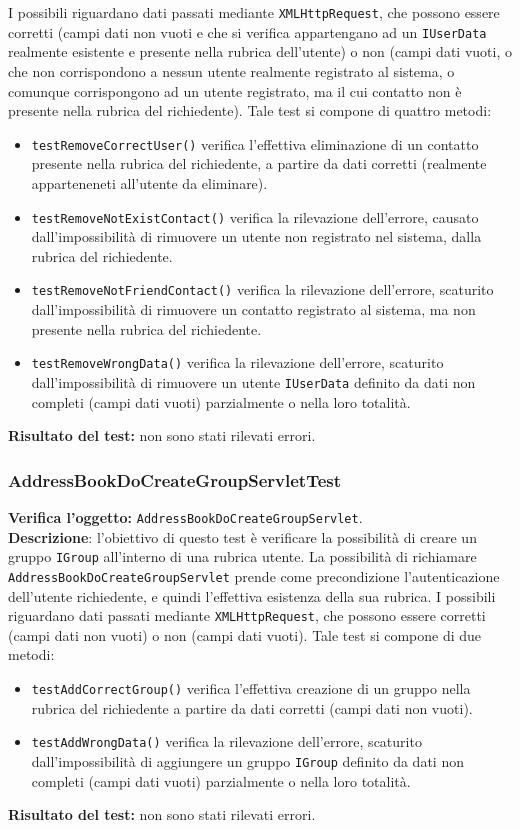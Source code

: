 I possibili  riguardano dati passati mediante \texttt{XMLHttpRequest}, che possono essere corretti (campi dati non vuoti e che si verifica appartengano ad un \texttt{IUserData} realmente esistente e presente nella rubrica dell'utente) o non (campi dati vuoti, o che non corrispondono a nessun utente realmente registrato al sistema, o comunque corrispongono ad un utente registrato, ma il cui contatto non è presente nella rubrica del richiedente).
Tale test si compone di quattro metodi:
\begin{itemize}
\item \texttt{testRemoveCorrectUser()} verifica l'effettiva eliminazione di un contatto presente nella rubrica del richiedente, a partire da dati corretti (realmente apparteneneti all'utente da eliminare).
\item \texttt{testRemoveNotExistContact()} verifica la rilevazione dell'errore, causato dall'impossibilità di rimuovere un utente non registrato nel sistema, dalla rubrica del richiedente.
\item \texttt{testRemoveNotFriendContact()} verifica la rilevazione dell'errore, scaturito dall'impossibilità di rimuovere un contatto registrato al sistema, ma non presente nella rubrica del richiedente. 
\item \texttt{testRemoveWrongData()} verifica la rilevazione dell'errore, scaturito dall'impossibilità di rimuovere un utente \texttt{IUserData} definito da dati non completi (campi dati vuoti) parzialmente o nella loro totalità.
\end{itemize}
\textbf{Risultato del test:} non sono stati rilevati errori.

\subsubsection{AddressBookDoCreateGroupServletTest}
\textbf{Verifica l'oggetto:} \texttt{AddressBookDoCreateGroupServlet}.\\
\textbf{Descrizione}: l'obiettivo di questo test è verificare la possibilità di creare un gruppo \texttt{IGroup} all'interno di una rubrica utente. La possibilità di richiamare \texttt{AddressBookDoCreateGroupServlet} prende come precondizione l'autenticazione dell'utente richiedente, e quindi l'effettiva esistenza della sua rubrica. I possibili  riguardano dati passati mediante \texttt{XMLHttpRequest}, che possono essere corretti (campi dati non vuoti) o non (campi dati vuoti).
Tale test si compone di due metodi:
\begin{itemize}
\item \texttt{testAddCorrectGroup()} verifica l'effettiva creazione di un gruppo nella rubrica del richiedente a partire da dati corretti (campi dati non vuoti).
\item \texttt{testAddWrongData()} verifica la rilevazione dell'errore, scaturito dall'impossibilità di aggiungere un gruppo \texttt{IGroup} definito da dati non completi (campi dati vuoti) parzialmente o nella loro totalità.
\end{itemize}
\textbf{Risultato del test:} non sono stati rilevati errori.

